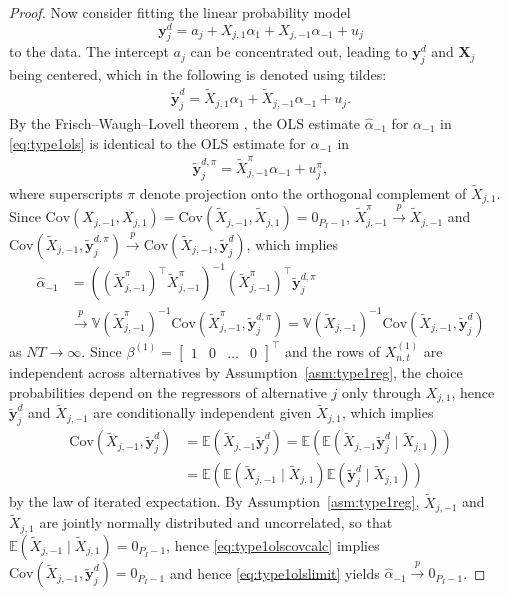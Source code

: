 \documentclass[preprint,12pt,authoryear]{elsarticle}
\newcommand{\pto}{\xrightarrow{p}}
\newcommand{\E}{\mathbb{E}}
\newcommand{\Var}{\mathbb{V}}
\newcommand{\Cov}{\text{Cov}}
\begin{document}
\begin{proof}
Now consider fitting the linear probability model $$\bm{y}_{j}^d = a_j + X_{j,1} \alpha_1 + X_{j,-1} \alpha_{-1} + u_{j}$$ to the data. The intercept $a_j$ can be concentrated out, leading to $\bm{y}_{j}^d$ and $\bm{X}_{j}$ being centered, which in the following is denoted using tildes:
%
\begin{align}
\label{eq:type1ols}
\tilde{\bm{y}}_{j}^d = \tilde{X}_{j,1} \alpha_1 + \tilde{X}_{j,-1} \alpha_{-1} + u_{j}.
\end{align}
%
By the Frisch--Waugh--Lovell theorem \citep{Frisch1933}, the OLS estimate $\hat \alpha_{-1}$ for $\alpha_{-1}$ in \eqref{eq:type1ols} is identical to the OLS estimate for $\alpha_{-1}$ in
%
\begin{align*}
\tilde{\bm{y}}_{j}^{d,\pi} = \tilde{X}_{j,-1}^{\pi} \alpha_{-1} + u_{j}^\pi,
\end{align*}
%
where superscripts $\pi$ denote projection onto the orthogonal complement of $\tilde{X}_{j,1}$. Since $\Cov(X_{j,-1}, X_{j,1}) = \Cov(\tilde{X}_{j,-1}, \tilde{X}_{j,1}) = 0_{P_I - 1}$, $\tilde{X}_{j,-1}^{\pi} \pto \tilde{X}_{j,-1}$ and $\Cov(\tilde{X}_{j,-1}, \tilde{\bm{y}}_{j}^{d,\pi}) \pto \Cov(\tilde{X}_{j,-1}, \tilde{\bm{y}}_{j}^d)$, which implies
%
\begin{equation}
\begin{aligned}
\label{eq:type1olslimit}
\hat{\alpha}_{-1} &= \left( (\tilde{X}_{j,-1}^{\pi}) ^\top \tilde{X}_{j,-1}^{\pi} \right)^{-1} (\tilde{X}_{j,-1}^{\pi}) ^\top \tilde{\bm{y}}_{j}^{d,\pi} \\ &\pto \Var(\tilde{X}_{j,-1}^\pi)^{-1} \Cov(\tilde{X}_{j,-1}^\pi,\tilde{\bm{y}}_{j}^{d, \pi}) = \Var(\tilde{X}_{j,-1})^{-1} \Cov(\tilde{X}_{j,-1},\tilde{\bm{y}}_{j}^d) \end{aligned}
\end{equation}
%
as $NT \to \infty$. Since $\beta^{(1)} = \begin{bmatrix} 1 & 0 & \dots & 0 \end{bmatrix}^\top$ and the rows of $X^{(1)}_{n,t}$ are independent across alternatives by Assumption~\ref{asm:type1reg}, the choice probabilities depend on the regressors of alternative $j$ only through $X_{j,1}$, hence $\tilde{\bm{y}}^d_{j}$ and $\tilde{X}_{j,-1}$ are conditionally independent given $\tilde{X}_{j,1}$, which implies
%
\begin{equation}
\begin{aligned}
\label{eq:type1olscovcalc}
\Cov(\tilde X_{j,-1},\tilde{\bm{y}}^d_{j}) &= \E(\tilde X_{j,-1}\tilde{\bm{y}}^d_{j}) = \E\left(\E(\tilde X_{j,-1}\tilde{\bm{y}}^d_{j} \mid \tilde{X}_{j,1})\right) \\ &= \E\left(\E(\tilde X_{j,-1} \mid \tilde{X}_{j,1}) \E(\tilde{\bm{y}}^d_{j} \mid \tilde{X}_{j,1})\right)
\end{aligned}
\end{equation}
%
by the law of iterated expectation. By Assumption~\ref{asm:type1reg}, $\tilde{X}_{j,-1}$ and $\tilde{X}_{j,1}$ are jointly normally distributed and uncorrelated, so that $\E(\tilde X_{j,-1} \mid \tilde{X}_{j,1}) = 0_{P_I - 1}$, hence \eqref{eq:type1olscovcalc} implies $\Cov(\tilde X_{j,-1},\tilde{\bm{y}}^d_{j}) = 0_{P_I - 1}$ and hence \eqref{eq:type1olslimit} yields $\hat{\alpha}_{-1} \pto 0_{P_I - 1}$.


\end{proof}
\end{document}
